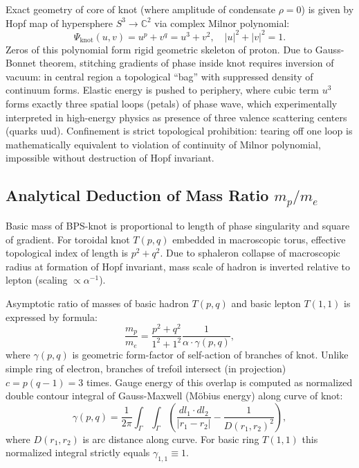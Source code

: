 \documentclass[12pt,a4paper]{article}
\begin{document}
Exact geometry of core of knot (where amplitude of condensate $\rho=0$) is given by Hopf map of hypersphere $S^3 \to \mathbb{C}^2$ via complex Milnor polynomial:
\begin{equation}
    \Psi_{\text{knot}}(u,v) = u^p + v^q = u^3 + v^2, \quad |u|^2+|v|^2=1.
    \label{eq:milnor_polynomial}
\end{equation}
Zeros of this polynomial form rigid geometric skeleton of proton. Due to Gauss-Bonnet theorem, stitching gradients of phase inside knot requires inversion of vacuum: in central region a topological ``bag'' with suppressed density of continuum forms. Elastic energy is pushed to periphery, where cubic term $u^3$ forms exactly three spatial loops (petals) of phase wave, which experimentally interpreted in high-energy physics as presence of three valence scattering centers (quarks uud). Confinement is strict topological prohibition: tearing off one loop is mathematically equivalent to violation of continuity of Milnor polynomial, impossible without destruction of Hopf invariant.

\subsection{Analytical Deduction of Mass Ratio $m_p/m_e$}
Basic mass of BPS-knot is proportional to length of phase singularity and square of gradient. For toroidal knot $T(p,q)$ embedded in macroscopic torus, effective topological index of length is $p^2+q^2$. Due to sphaleron collapse of macroscopic radius at formation of Hopf invariant, mass scale of hadron is inverted relative to lepton (scaling $\propto \alpha^{-1}$).

Asymptotic ratio of masses of basic hadron $T(p,q)$ and basic lepton $T(1,1)$ is expressed by formula:
\begin{equation}
    \frac{m_p}{m_e} = \frac{p^2+q^2}{1^2+1^2} \frac{1}{\alpha \cdot \gamma(p,q)},
    \label{eq:mass_ratio_formula}
\end{equation}
where $\gamma(p,q)$ is geometric form-factor of self-action of branches of knot. Unlike simple ring of electron, branches of trefoil intersect (in projection) $c=p(q-1)=3$ times. Gauge energy of this overlap is computed as normalized double contour integral of Gauss-Maxwell (Möbius energy) along curve of knot:
\begin{equation}
    \gamma(p,q) = \frac{1}{2\pi} \int_{\Gamma} \int_{\Gamma} \left( \frac{dl_1 \cdot dl_2}{|r_1-r_2|} - \frac{1}{D(r_1,r_2)^2} \right),
    \label{eq:moebius_energy_integral}
\end{equation}
where $D(r_1,r_2)$ is arc distance along curve. For basic ring $T(1,1)$ this normalized integral strictly equals $\gamma_{1,1} \equiv 1$.
\end{document}
